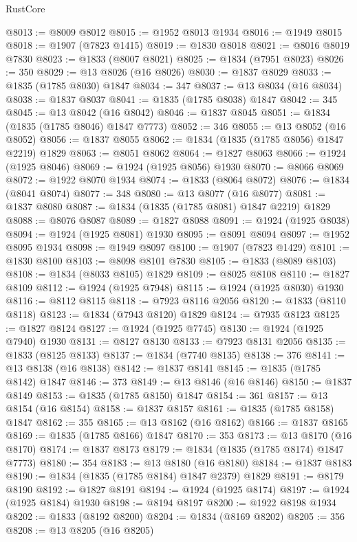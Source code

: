 \begin{lexlean}{RustCore}
\begin{coremodule}
@8013 := @8009 @8012
@8015 := @1952 @8013 @1934
@8016 := @1949 @8015
@8018 := @1907 (@7823 @1415)
@8019 := @1830 @8018
@8021 := @8016 @8019 @7830
@8023 := @1833 (@8007 @8021)
@8025 := @1834 (@7951 @8023)
@8026 := 350
@8029 := @13 @8026 (@16 @8026)
@8030 := @1837 @8029
@8033 := @1835 (@1785 @8030) @1847
@8034 := 347
@8037 := @13 @8034 (@16 @8034)
@8038 := @1837 @8037
@8041 := @1835 (@1785 @8038) @1847
@8042 := 345
@8045 := @13 @8042 (@16 @8042)
@8046 := @1837 @8045
@8051 := @1834 (@1835 (@1785 @8046) @1847 @7773)
@8052 := 346
@8055 := @13 @8052 (@16 @8052)
@8056 := @1837 @8055
@8062 := @1834 (@1835 (@1785 @8056) @1847 @2219) @1829
@8063 := @8051 @8062
@8064 := @1827 @8063
@8066 := @1924 (@1925 @8046)
@8069 := @1924 (@1925 @8056) @1930
@8070 := @8066 @8069
@8072 := @1922 @8070 @1934
@8074 := @1833 (@8064 @8072)
@8076 := @1834 (@8041 @8074)
@8077 := 348
@8080 := @13 @8077 (@16 @8077)
@8081 := @1837 @8080
@8087 := @1834 (@1835 (@1785 @8081) @1847 @2219) @1829
@8088 := @8076 @8087
@8089 := @1827 @8088
@8091 := @1924 (@1925 @8038)
@8094 := @1924 (@1925 @8081) @1930
@8095 := @8091 @8094
@8097 := @1952 @8095 @1934
@8098 := @1949 @8097
@8100 := @1907 (@7823 @1429)
@8101 := @1830 @8100
@8103 := @8098 @8101 @7830
@8105 := @1833 (@8089 @8103)
@8108 := @1834 (@8033 @8105) @1829
@8109 := @8025 @8108
@8110 := @1827 @8109
@8112 := @1924 (@1925 @7948)
@8115 := @1924 (@1925 @8030) @1930
@8116 := @8112 @8115
@8118 := @7923 @8116 @2056
@8120 := @1833 (@8110 @8118)
@8123 := @1834 (@7943 @8120) @1829
@8124 := @7935 @8123
@8125 := @1827 @8124
@8127 := @1924 (@1925 @7745)
@8130 := @1924 (@1925 @7940) @1930
@8131 := @8127 @8130
@8133 := @7923 @8131 @2056
@8135 := @1833 (@8125 @8133)
@8137 := @1834 (@7740 @8135)
@8138 := 376
@8141 := @13 @8138 (@16 @8138)
@8142 := @1837 @8141
@8145 := @1835 (@1785 @8142) @1847
@8146 := 373
@8149 := @13 @8146 (@16 @8146)
@8150 := @1837 @8149
@8153 := @1835 (@1785 @8150) @1847
@8154 := 361
@8157 := @13 @8154 (@16 @8154)
@8158 := @1837 @8157
@8161 := @1835 (@1785 @8158) @1847
@8162 := 355
@8165 := @13 @8162 (@16 @8162)
@8166 := @1837 @8165
@8169 := @1835 (@1785 @8166) @1847
@8170 := 353
@8173 := @13 @8170 (@16 @8170)
@8174 := @1837 @8173
@8179 := @1834 (@1835 (@1785 @8174) @1847 @7773)
@8180 := 354
@8183 := @13 @8180 (@16 @8180)
@8184 := @1837 @8183
@8190 := @1834 (@1835 (@1785 @8184) @1847 @2379) @1829
@8191 := @8179 @8190
@8192 := @1827 @8191
@8194 := @1924 (@1925 @8174)
@8197 := @1924 (@1925 @8184) @1930
@8198 := @8194 @8197
@8200 := @1922 @8198 @1934
@8202 := @1833 (@8192 @8200)
@8204 := @1834 (@8169 @8202)
@8205 := 356
@8208 := @13 @8205 (@16 @8205)

\end{coremodule}
\end{lexlean}
